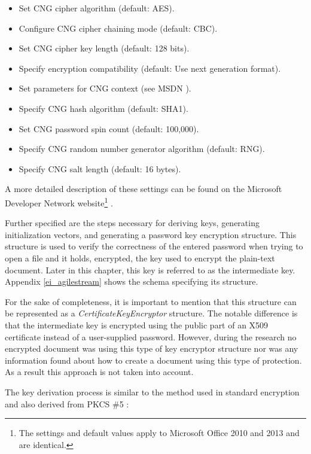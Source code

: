 \documentclass[11pt,oneside]{fithesis2}
\begin{document}
\begin{itemize}
\setlength\itemsep{0.1em}
	\item{Set CNG cipher algorithm (default: AES).}
	\item{Configure CNG cipher chaining mode (default: CBC).}
	\item{Set CNG cipher key length (default: 128 bits).}
	\item{Specify encryption compatibility (default: Use next generation format).}
	\item{Set parameters for CNG context (see MSDN \cite{cng_functions}).}	
	\item{Specify CNG hash algorithm (default: SHA1).}
	\item{Set CNG password spin count (default: 100,000).}
	\item{Specify CNG random number generator algorithm (default: RNG).}
	\item{Specify CNG salt length (default: 16 bytes).}
\end{itemize}

A more detailed description of these settings can be found on the Microsoft Developer Network website\footnote{The settings and default values apply to Microsoft Office 2010 and 2013 and are identical.} \cite{plan_office_crypto}. 

Further specified are the steps necessary for deriving keys, generating initialization vectors, and generating a password key encryption structure. This structure is used to verify the correctness of the entered password when trying to open a file and it holds, encrypted, the key used to encrypt the plain-text document. Later in this chapter, this key is referred to as the intermediate key. Appendix \ref{ei_agilestream} shows the schema specifying its structure.

For the sake of completeness, it is important to mention that this structure can be represented as a \textit{CertificateKeyEncryptor} structure. The notable difference is that the intermediate key is encrypted using the public part of an X509 certificate instead of a user-supplied password. However, during the research no encrypted document was using this type of key encryptor structure nor was any information found about how to create a document using this type of protection. As a result this approach is not taken into account.

The key derivation process is similar to the method used in standard encryption and also derived from PKCS \#5 \cite{rfc2898}:
\end{document}
